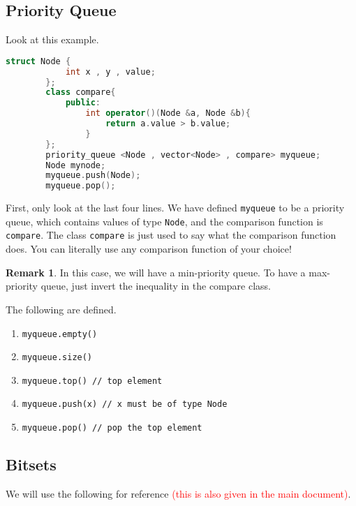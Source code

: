 \documentclass[12pt,a4paper]{amsart}
\numberwithin{equation}{section}
\theoremstyle{definition}
\newtheorem{Remark}{Remark}[Th]
\begin{document}
\subsection{Priority Queue} Look at this example. 
    \begin{lstlisting}[language=C++]  
        struct Node {
            int x , y , value;
        };
        class compare{
            public: 
                int operator()(Node &a, Node &b){
                    return a.value > b.value;
                }
        };
        priority_queue <Node , vector<Node> , compare> myqueue;
        Node mynode;
        myqueue.push(Node);
        myqueue.pop();
    \end{lstlisting}
First, only look at the last four lines. We have defined \verb|myqueue| to be a priority queue, which contains values of type \verb|Node|, and the comparison function is \verb|compare|. The class \verb|compare| is just used to say what the comparison function does. You can literally use any comparison function of your choice! 

\begin{Remark}
    In this case, we will have a min-priority queue. To have a max-priority queue, just invert the inequality in the compare class. 
\end{Remark}

\noindent The following are defined. 
\begin{enumerate}
    \item \verb|myqueue.empty()|
    \item \verb|myqueue.size()|
    \item \verb|myqueue.top() // top element|
    \item \verb|myqueue.push(x) // x must be of type Node|
    \item \verb|myqueue.pop() // pop the top element|
\end{enumerate}

\subsection{Bitsets} We will use the following for reference \textcolor{red}{(this is also given in the main document)}.
\end{document}
